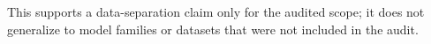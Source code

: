 This supports a data-separation claim only for the audited scope; it does not generalize to model families or datasets that were not included in the audit.
